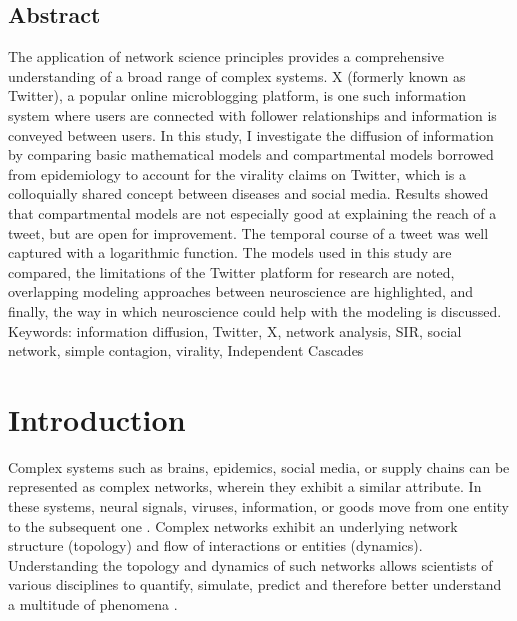 \documentclass[11pt,a4paper]{article}
\begin{document}
\newpage 
\begin{center}
    \section*{Abstract}     
\end{center}
The application of network science principles provides a comprehensive understanding of a broad range of complex systems. X (formerly known as Twitter), a popular online microblogging platform, is one such information system where users are connected with follower relationships and information is conveyed between users. In this study, I investigate the diffusion of information by comparing basic mathematical models and compartmental models borrowed from epidemiology to account for the virality claims on Twitter, which is a colloquially shared concept between diseases and social media. Results showed that compartmental models are not especially good at explaining the reach of a tweet, but are open for improvement. The temporal course of a tweet was well captured with a logarithmic function. The models used in this study are compared, the limitations of the Twitter platform for research are noted, overlapping modeling approaches between neuroscience are highlighted, and finally, the way in which neuroscience could help with the modeling is discussed. \\

Keywords: information diffusion, Twitter, X, network analysis, SIR, social network, simple contagion, virality, Independent Cascades

\newpage
\tableofcontents

\newpage
\section{Introduction}
Complex systems such as brains, epidemics, social media, or supply chains can be represented as complex networks, wherein they exhibit a similar attribute. In these systems, neural signals, viruses, information, or goods move from one entity to the subsequent one \cite{lewis_network_2011, strogatz_exploring_2001}. Complex networks exhibit an underlying network structure (topology) and flow of interactions or entities (dynamics). Understanding the topology and dynamics of such networks allows scientists of various disciplines to quantify, simulate, predict and therefore better understand a multitude of phenomena \cite{boccaletti_complex_2006}.
\end{document}
